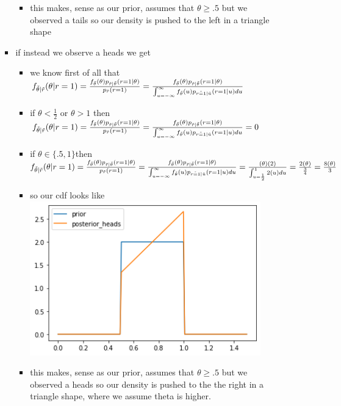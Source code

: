 \documentclass[12pt,twoside]{article}
\begin{document}
\begin{enumerate}
\begin{enumerate}
\begin{itemize}
\begin{itemize}
        \item this makes, sense as our prior, assumes that $\theta\geq.5$ but we observed a tails so our density is pushed to the left in a triangle shape
    \end{itemize}
    \item if instead we observe a heads we get 
    \begin{itemize}
        \item we know first of all that $f_{\Tilde{\theta}|\Tilde{r}}(\theta|r=1)=\frac{f_{\Tilde{\theta}}(\theta)p_{\Tilde{r}|\Tilde{\theta}}(r=1|\theta)}{p_{\Tilde{r}}(r=1)}=\frac{f_{\Tilde{\theta}}(\theta)p_{\Tilde{r}|\Tilde{\theta}}(r=1|\theta)}{\int_{u=-\infty}^{\infty} f_{\Tilde{\theta}}(u)p_{\Tilde{r=1}|\Tilde{u}}(r=1|u)du}$
        \item if $\theta<\frac{1}{2}$ or  $\theta>1$ then  $f_{\Tilde{\theta}|\Tilde{r}}(\theta|r=1)=\frac{f_{\Tilde{\theta}}(\theta)p_{\Tilde{r}|\Tilde{\theta}}(r=1|\theta)}{p_{\Tilde{r}}(r=1)}=\frac{f_{\Tilde{\theta}}(\theta)p_{\Tilde{r}|\Tilde{\theta}}(r=1|\theta)}{\int_{u=-\infty}^{\infty} f_{\Tilde{\theta}}(u)p_{\Tilde{r=1}|\Tilde{u}}(r=1|u)du}=0$
        \item if $\theta \in \{.5,1\}$then  $f_{\Tilde{\theta}|\Tilde{r}}(\theta|r=1)=\frac{f_{\Tilde{\theta}}(\theta)p_{\Tilde{r}|\Tilde{\theta}}(r=1|\theta)}{p_{\Tilde{r}}(r=1)}=\frac{f_{\Tilde{\theta}}(\theta)p_{\Tilde{r}|\Tilde{\theta}}(r=1|\theta)}{\int_{u=-\infty}^{\infty} f_{\Tilde{\theta}}(u)p_{\Tilde{r=1}|\Tilde{u}}(r=1|u)du}=\frac{(\theta)(2)}{\int_{u=\frac{1}{2}}^{1}2(u)du}=\frac{2(\theta)}{\frac{3}{4}}=\frac{8(\theta)}{3}$
              \item so our cdf looks like \\\includegraphics[width=10cm]{homework 8/homework_8_question_1b_1.png}
        \item this makes, sense as our prior, assumes that $\theta\geq.5$ but we observed a heads so our density is pushed to the the right in a triangle shape, where we assume theta is higher.
    \end{itemize}
\end{itemize}


\end{enumerate}
\end{enumerate}
\end{document}
